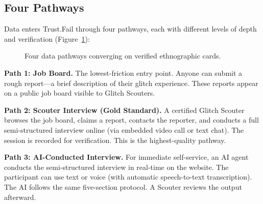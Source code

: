 \documentclass[11pt,a4paper]{article}
\begin{document}
\subsection{Four Pathways}

Data enters Trust.Fail through four pathways, each with different levels of depth and verification (Figure~\ref{fig:pathways}):

\begin{figure}[h]
\centering
{}
\caption{Four data pathways converging on verified ethnographic cards.}
\label{fig:pathways}
\end{figure}

\textbf{Path 1: Job Board.} The lowest-friction entry point. Anyone can submit a rough report---a brief description of their glitch experience. These reports appear on a public job board visible to Glitch Scouters.

\textbf{Path 2: Scouter Interview (Gold Standard).} A certified Glitch Scouter browses the job board, claims a report, contacts the reporter, and conducts a full semi-structured interview online (via embedded video call or text chat). The session is recorded for verification. This is the highest-quality pathway.

\textbf{Path 3: AI-Conducted Interview.} For immediate self-service, an AI agent conducts the semi-structured interview in real-time on the website. The participant can use text or voice (with automatic speech-to-text transcription). The AI follows the same five-section protocol. A Scouter reviews the output afterward.
\end{document}
